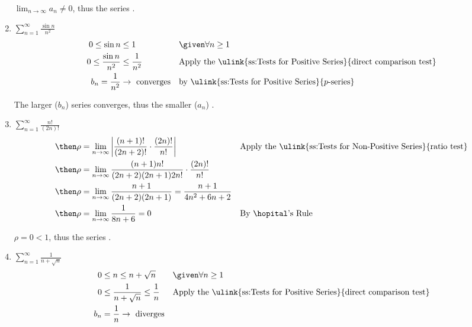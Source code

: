 \begin{enumerate}[itemsep=3em]
    \(\lim_{n \to \infty} a_n \neq 0\), thus the series .

  \vspace{-16pt}
  \item \(\displaystyle \sum_{n=1}^{\infty} \frac{\sin n}{n^2} \)
    \begin{align*}
      0 \leq \sin  n &\leq 1 && \given \forall n \geq 1 \\
      0 \leq \frac{\sin n}{n^2} &\leq \frac{1}{n^2}
      && \text{Apply the \ulink{ss:Tests for Positive Series}{direct comparison test}} \\
      b_n = \frac{1}{n^2} &\to ~\text{converges}
      && \text{by \ulink{ss:Tests for Positive Series}{\(p\)-series}}
    \end{align*}

    The larger (\(b_n\)) series converges, thus the smaller (\(a_n\)) .

  \vspace{-16pt}
  \item \(\displaystyle \sum_{n=1}^{\infty} \frac{n!}{(2n)!} \)
    \begin{align*}
     &\then \rho = \lim_{n \to \infty} \left|
     \frac{(n+1)!}{(2n+2)!} \cdot \frac{(2n)!}{n!} \right|
     && \text{Apply the \ulink{ss:Tests for Non-Positive Series}{ratio test}} \\
     &\then \rho = \lim_{n \to \infty}
     \frac{(n+1)n!}{(2n+2)(2n+1)2n!} \cdot \frac{(2n)!}{n!} \\
     &\then \rho = \lim_{n \to \infty}
     \frac{n+1}{(2n+2)(2n+1)} =
     \frac{n+1}{4n^2+6n+2} \\
     &\then \rho = \lim_{n \to \infty} \frac{1}{8n + 6} = 0
     && \text{By \hopital's Rule} \\
    \end{align*}

  \(\rho = 0 < 1\), thus the series .

  \vspace{-16pt}
  \item \(\displaystyle \sum_{n=1}^{\infty} \frac{1}{n + \sqrt{n} } \)
    \begin{align*}
      0 &\leq n \leq n +\sqrt{n}  && \given \forall n \geq 1 \\
      0 &\leq \frac{1}{n+\sqrt{n} } \leq \frac{1}{n}
      && \text{Apply the \ulink{ss:Tests for Positive Series}{direct comparison test}} \\
      b_n &= \frac{1}{n} \to ~\text{diverges}
    \end{align*}


\end{enumerate}
